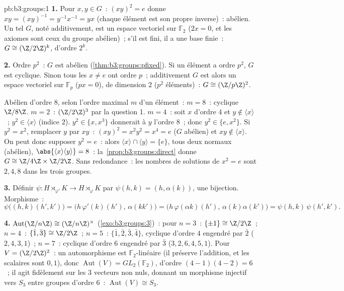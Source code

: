 \begin{solution}{pb:b3:groups:1}
\textbf{1.} Pour $x, y \in G$~: $(xy)^2 = e$ donne $xy =
(xy)^{-1} = y^{-1}x^{-1} = yx$ (chaque élément est son propre
inverse)~: abélien. Un tel $G$, noté additivement, est un espace
vectoriel sur $\mathbb F_2$ ($2x = 0$, et les axiomes sont ceux
du groupe abélien)~; s'il est fini, il a une base finie~: $G
\cong (\Z/2\Z)^k$, d'ordre $2^k$.

\textbf{2.} Ordre $p^2$~: $G$ est abélien
(\cref{thm:b3:groups:pfixed}). Si un élément a ordre $p^2$, $G$
est cyclique. Sinon tous les $x \neq e$ ont ordre $p$~;
additivement $G$ est alors un espace vectoriel sur $\mathbb F_p$
($px = 0$), de dimension $2$ ($p^2$ éléments)~: $G \cong
(\Z/p\Z)^2$.

Abélien d'ordre $8$, selon l'ordre maximal $m$ d'un élément~: $m
= 8$~: cyclique $\Z/8\Z$. $m = 2$~: $(\Z/2\Z)^3$ par la question
1. $m = 4$~: soit $x$ d'ordre $4$ et $y \notin \langle x
\rangle$~; $y^2 \in \langle x\rangle$ (indice $2$). $y^2 \in
\{x, x^3\}$ donnerait à $y$ l'ordre $8$~; donc $y^2 \in \{e,
x^2\}$. Si $y^2 = x^2$, remplacer $y$ par $xy$~: $(xy)^2 =
x^2y^2 = x^4 = e$ ($G$ abélien) et $xy \notin \langle x\rangle$.
On peut donc supposer $y^2 = e$~: alors $\langle x \rangle \cap
\langle y \rangle = \{e\}$, tous deux normaux (abélien),
$\abs{\langle x\rangle \langle y\rangle} = 8$~:
la~\cref{prop:b3:groups:direct} donne $G \cong \Z/4\Z \times
\Z/2\Z$. Sans redondance~: les nombres de solutions de $x^2 = e$
sont $2, 4, 8$ dans les trois groupes.

\textbf{3.} Définir $\psi \colon H \rtimes_{\varphi'} K \to H
\rtimes_{\varphi} K$ par $\psi(h, k) = (h, \alpha(k))$, une
bijection. Morphisme~:
\[
\psi\bigl((h,k)(h',k')\bigr)
= \bigl(h\,\varphi'(k)(h'),\, \alpha(kk')\bigr)
= \bigl(h\,\varphi(\alpha k)(h'),\, \alpha(k)\alpha(k')\bigr)
= \psi(h,k)\,\psi(h',k').
\]

\textbf{4.} $\operatorname{Aut}(\Z/n\Z) \cong (\Z/n\Z)^\times$
(\cref{exo:b3:groups:3})~: pour $n = 3$~: $\{\pm 1\} \cong
\Z/2\Z$~; $n = 4$~: $\{\bar 1, \bar 3\} \cong \Z/2\Z$~; $n =
5$~: $\{\bar 1, \bar 2, \bar 3, \bar 4\}$, cyclique d'ordre $4$
engendré par $\bar 2$ ($2, 4, 3, 1$)~; $n = 7$~: cyclique d'ordre
$6$ engendré par $\bar 3$ ($3, 2, 6, 4, 5, 1$). Pour $V =
(\Z/2\Z)^2$~: un automorphisme est $\mathbb F_2$-linéaire (il
préserve l'addition, et les scalaires sont $0, 1$), donc
$\operatorname{Aut}(V) = GL_2(\mathbb F_2)$, d'ordre $(4-1)(4-2)
= 6$~; il agit fidèlement sur les $3$ vecteurs non nuls, donnant
un morphisme injectif vers $S_3$ entre groupes d'ordre $6$~:
$\operatorname{Aut}(V) \cong S_3$.


\end{solution}
